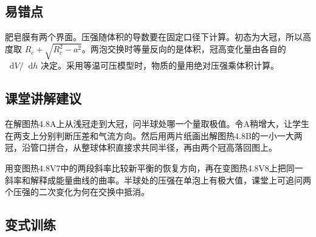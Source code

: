 \documentclass[UTF8,fontset=fandol,a4paper,11pt]{ctexart}
\newcommand{\dd}{\mathop{}\!\mathrm{d}}
\begin{document}


\subsection*{易错点}

肥皂膜有两个界面。压强随体积的导数要在固定口径下计算。初态为大冠，所以高度取 $R_c+\sqrt{R_c^2-a^2}$。两泡交换时等量反向的是体积，冠高变化量由各自的 $\dd V/\dd h$ 决定。采用等温可压模型时，物质的量用绝对压强乘体积计算。



\subsection*{课堂讲解建议}

在解图热4.8A上从浅冠走到大冠，问半球处哪一个量取极值。令A稍增大，让学生在两支上分别判断压差和气流方向。然后用两片纸画出解图热4.8B的一小一大两冠，沿管口拼合，从整球体积直接求共同半径，再由两个冠高落回图上。

用变图热4.8V7中的两段斜率比较新平衡的恢复方向，再在变图热4.8V8上把同一斜率和解释成能量曲线的曲率。半球处的压强在单泡上有极大值，课堂上可追问两个压强的二次变化为何在交换中抵消。



\subsection*{变式训练}
\end{document}
